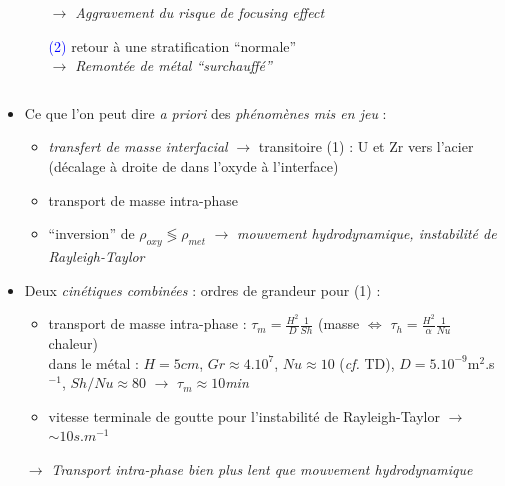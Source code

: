 \begin{frame}
\begin{columns}[T]
\begin{column}{0.55\textwidth}
\begin{minipage}{1.1\textwidth}
\begin{itemize}
\begin{itemize}
	\emph{$\rightarrow$ Aggravement du risque de focusing effect}
	\item[\textcolor{blue}{(2)}] retour à une stratification ``normale'' \\
	\emph{$\rightarrow$ Remontée de métal ``surchauffé''}
	\end{itemize}
	\end{itemize}
	\end{minipage}
	\end{column}
	\end{columns}
	\begin{itemize}
	\item Ce que l'on peut dire \textit{a priori} des \emph{phénomènes mis en jeu} :
	\begin{itemize}
	\item \emph{transfert de masse interfacial} $\rightarrow$ transitoire \textcolor{OliveGreen}{(1)} : U et Zr vers l’acier \\
	{\tiny (décalage à droite de  dans l'oxyde à l’interface)}
	\item transport de masse intra-phase
	\item ``inversion'' de $\rho_{oxy} \lessgtr \rho_{met}$ $\rightarrow$ \emph{mouvement hydrodynamique, instabilité de Rayleigh-Taylor}
	\end{itemize}
	\item Deux \emph{cinétiques combinées} : ordres de grandeur pour \textcolor{OliveGreen}{(1)} :
	\begin{itemize}
	\item transport de masse intra-phase : {\tiny $\tau_m = \frac{H^2}{D} \frac{1}{Sh}$ (masse $\Leftrightarrow$ $\tau_h = \frac{H^2}{\alpha} \frac{1}{Nu}$ chaleur) \\
	dans le métal : $H=5cm$, $Gr\approx 4.10^{7}$, $Nu\approx10$ (\textit{cf.} TD), $D=5.10^{-9}$m$^2$.s$^{-1}$, $Sh/Nu\approx80$ $\rightarrow$} \emph{$\tau_m \approx 10$min}
	\item vitesse terminale de goutte pour l'instabilité de Rayleigh-Taylor $\rightarrow$ \emph{$\sim 10s.m^{-1}$}
	\end{itemize}
	\hskip -0.5cm $\rightarrow$ \emph{Transport intra-phase bien plus lent que mouvement hydrodynamique}
	\end{itemize}
\end{frame}
